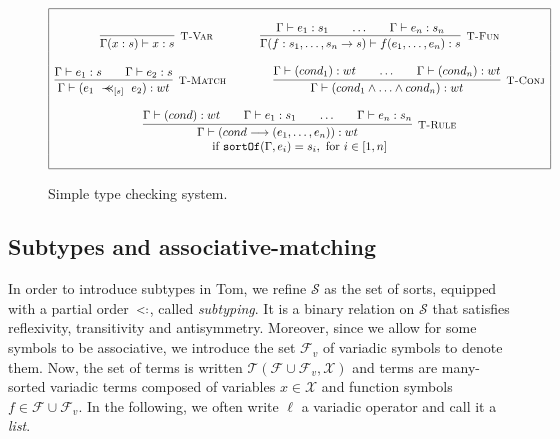 \documentclass{eptcs}
\newcommand{\tom}{\textsf{Tom}\xspace}
\newcommand{\TT}{\ensuremath{\mathcal{T}}\xspace}
\newcommand{\XX}{\ensuremath{\mathcal{X}}\xspace}
\newcommand{\caS}{\ensuremath{\mathcal{S}}\xspace}
\newcommand{\caF}{\ensuremath{\mathcal{F}}\xspace}
\newcommand{\TFVX}{\ensuremath{\TT(\caF \cup \caF_v,\XX)}\xspace}
\newcommand{\match}{\mathrel{\mbox{$\prec\hspace{-0.5em}\prec$}}}
\newcommand{\TVar}{{\small \textsc{T-Var}}}
\newcommand{\TFun}{{\small \textsc{T-Fun}}}
\newcommand{\TMatch}{{\small \textsc{T-Match}}}
\newcommand{\TConj}{{\small \textsc{T-Conj}}}
\newcommand{\TRule}{{\small \textsc{T-Rule}}}
\newcommand{\sub}{\mathrel{\mbox{{\footnotesize $<:$}}}}
\newcommand{\wt}[0]{{\ensuremath{wt}}}
\newcommand{\sortof}[2]{\texttt{sortOf}\ensuremath{(#1,#2)}}
\newcommand{\sig}[2]{\ensuremath{{#1}\rightarrow{#2}}}
\begin{document}
\begin{figure}[h!]
$$
\begin{array}{|c|}
\hline\\
        \infer[\TVar] 
                {\Gamma(x : s) \vdash x : s}
                {}
        \quad\quad\quad\quad
        \infer[\TFun]
                {\Gamma(f : \sig{s_1,\ldots,s_n}{s}) \vdash f(e_1, \ldots, e_n) : s}
                {\Gamma \vdash e_1 : s_1
                &\quad  
                \ldots
                &\quad
                \Gamma \vdash e_n : s_n}        \\
                                                \\
        \infer[\TMatch]
                {\Gamma \vdash (e_1 ~\match_{[s]}~ e_2) : \wt}
                {\Gamma \vdash e_1 : s
                &\quad  
                \Gamma \vdash e_2 : s}
        \quad\quad\quad\quad
        \infer[\TConj]
                {\Gamma \vdash (cond_1 \wedge \ldots \wedge cond_n) : \wt}
                {\Gamma \vdash (cond_1) : \wt
                &\quad
                \ldots
                &\quad
                \Gamma \vdash (cond_n) : \wt}   \\
                                                \\
        \infer[\TRule]
                {\Gamma \vdash (cond \longrightarrow (e_1, \ldots, e_n)) : \wt}
                {\Gamma \vdash (cond) : \wt
                &\quad
                \Gamma \vdash e_1 : s_1
                &\quad
                \ldots
                &\quad
                \Gamma \vdash e_n : s_n}        \\
                \mbox{if~} \sortof{\Gamma}{e_i} = s_i, \mbox{~for~} i \in [1,n]      \\
                                                \\
\hline
\end{array}
$$
\caption{Simple type checking system.}
\label{fig:simplechecking}
\end{figure}

\subsection{Subtypes and associative-matching}
\label{subsec:subtypes}

In order to introduce subtypes in \tom, we refine $\caS$ as the set of sorts, equipped
with a partial order~$\sub$, called {\em subtyping}. It is a binary relation on $\caS$
that satisfies reflexivity, transitivity and antisymmetry. Moreover, since we allow for
some symbols to be associative, we introduce the set $\caF_v$ of variadic symbols to
denote them.  Now, the set of terms is written $\TFVX$ and terms are many-sorted variadic
terms composed of variables $x\in\XX$ and function symbols $f\in\caF\cup\caF_v$. In the
following, we often write $\ell$ a variadic operator and call it a {\em list}.
\end{document}
